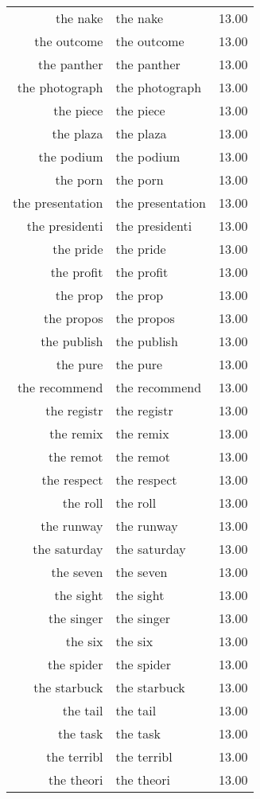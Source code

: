 \begin{table}[ht]
\begin{tabular}{rlr}
  the nake & the nake & 13.00 \\ 
  the outcome & the outcome & 13.00 \\ 
  the panther & the panther & 13.00 \\ 
  the photograph & the photograph & 13.00 \\ 
  the piece & the piece & 13.00 \\ 
  the plaza & the plaza & 13.00 \\ 
  the podium & the podium & 13.00 \\ 
  the porn & the porn & 13.00 \\ 
  the presentation & the presentation & 13.00 \\ 
  the presidenti & the presidenti & 13.00 \\ 
  the pride & the pride & 13.00 \\ 
  the profit & the profit & 13.00 \\ 
  the prop & the prop & 13.00 \\ 
  the propos & the propos & 13.00 \\ 
  the publish & the publish & 13.00 \\ 
  the pure & the pure & 13.00 \\ 
  the recommend & the recommend & 13.00 \\ 
  the registr & the registr & 13.00 \\ 
  the remix & the remix & 13.00 \\ 
  the remot & the remot & 13.00 \\ 
  the respect & the respect & 13.00 \\ 
  the roll & the roll & 13.00 \\ 
  the runway & the runway & 13.00 \\ 
  the saturday & the saturday & 13.00 \\ 
  the seven & the seven & 13.00 \\ 
  the sight & the sight & 13.00 \\ 
  the singer & the singer & 13.00 \\ 
  the six & the six & 13.00 \\ 
  the spider & the spider & 13.00 \\ 
  the starbuck & the starbuck & 13.00 \\ 
  the tail & the tail & 13.00 \\ 
  the task & the task & 13.00 \\ 
  the terribl & the terribl & 13.00 \\ 
  the theori & the theori & 13.00 \\ 

\end{tabular}
\end{table}
